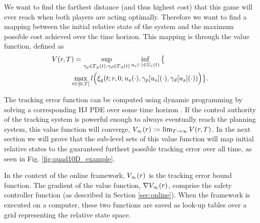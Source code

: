 

We want to find the farthest distance (and thus highest cost) that this game will ever reach when both players are acting optimally. Therefore we want to find a mapping between the initial relative state of the system and the maximum possible cost achieved over the time horizon. This mapping is through the value function, defined as
 \begin{align}
 \label{eq:valfunc}
 	V(r,&\,T)= \sup_{\gamma_{p} \in \Gamma_p(t), \gamma_{d} \in \Gamma_d(t)} \inf_{u_s(\cdot) \in \mathbb{U}_s(t)} \big\{\notag\\
 &\;\;\;\max_{t\in [0, T]} l\Big(\xi_g(t; r, 0, u_s(\cdot), \gamma_p[u_s](\cdot), \gamma_d[u_s](\cdot))\Big)\big\}.
 	\end{align}

The tracking error function can be computed using dynamic programming by solving a corresponding HJ PDE over some time horizon \cite{Mitchell05, Fisac15}. If the control authority of the tracking system is powerful enough to always eventually reach the planning system, this value function will converge, $V_\infty(r) := \lim_{T\rightarrow\infty} V(r, T)$. In the next section we will prove that the sub-level sets of this value function will map initial relative states to the guaranteed furthest possible tracking error over all time, as seen in Fig. \ref{fig:quad10D_example}.
 
In the context of the online framework, $V_\infty(r)$ is the tracking error bound function. The gradient of the value function, $\nabla V_\infty(r)$, comprise the safety controller function (as described in Section \ref{sec:online}). When the framework is executed on a computer, these two functions are saved as look-up tables over a grid representing the relative state space.
 
